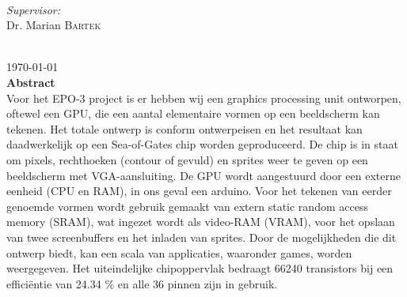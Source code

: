 \documentclass[12pt]{scrreprt}
\begin{document}
\begin{titlepage}
\begin{minipage}{0.4\textwidth}
\begin{flushleft}
\end{flushleft}
\end{minipage}
~
\begin{minipage}{0.4\textwidth}
\begin{flushright} \large
\emph{Supervisor:} \\
Dr. Marian \textsc{Bartek} %
\end{flushright}
\end{minipage}\\[3cm]



{\large \today}\\ [1.5cm]


 
% 

\textbf{Abstract} \\
Voor het EPO-3 project is er hebben wij een graphics processing unit ontworpen, oftewel een GPU, die een aantal elementaire vormen op een beeldscherm kan tekenen. Het totale ontwerp is conform ontwerpeisen en het resultaat kan daadwerkelijk op een Sea-of-Gates chip worden geproduceerd. De chip is in staat om pixels, rechthoeken (contour of gevuld) en sprites weer te geven op een beeldscherm met VGA-aansluiting. De GPU wordt aangestuurd door een externe eenheid (CPU en RAM), in ons geval een arduino. Voor het tekenen van eerder genoemde vormen wordt gebruik gemaakt van extern static random access memory (SRAM), wat ingezet wordt als video-RAM (VRAM), voor het opslaan van twee screenbuffers en het inladen van sprites. Door de mogelijkheden die dit ontwerp biedt, kan een scala van applicaties, waaronder games, worden weergegeven. Het uiteindelijke chipoppervlak bedraagt 66240 transistors bij een efficiëntie van 24.34 \% en alle 36 pinnen zijn in gebruik.

\vfill %

\end{titlepage}
\end{document}
